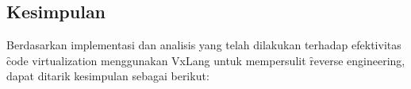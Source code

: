 \chapter{\babEnam}

\section{Kesimpulan}
Berdasarkan implementasi dan analisis yang telah dilakukan terhadap efektivitas \f{code virtualization} menggunakan VxLang untuk mempersulit \f{reverse engineering}, dapat ditarik kesimpulan sebagai berikut:

